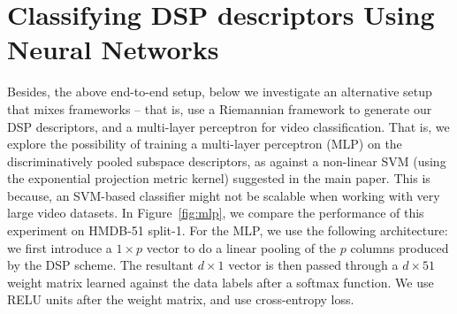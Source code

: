 \documentclass[runningheads]{llncs}
\begin{document}
 \section{Classifying DSP descriptors Using Neural Networks}
Besides, the above end-to-end setup, below we investigate an alternative setup that mixes frameworks -- that is, use a Riemannian framework to generate our DSP descriptors, and a multi-layer perceptron for video classification. That is, we explore the possibility of training a multi-layer perceptron (MLP) on the discriminatively pooled subspace descriptors, as against a non-linear SVM (using the exponential projection metric kernel) suggested in the main paper. This is because, an SVM-based classifier might not be scalable when working with very large video datasets. In Figure~\ref{fig:mlp}, we compare the performance of this experiment on HMDB-51 split-1. For the MLP, we use the following architecture: we first introduce a $1 \times p$ vector to do a linear pooling of the $p$ columns produced by the DSP scheme. The resultant $d\times 1$ vector is then passed through a $d\times 51$ weight matrix learned against the data labels after a softmax function. We use RELU units after the weight matrix, and use cross-entropy loss.

\begin{figure}
\begin{floatrow}
\end{floatrow}
\end{figure}
\end{document}
